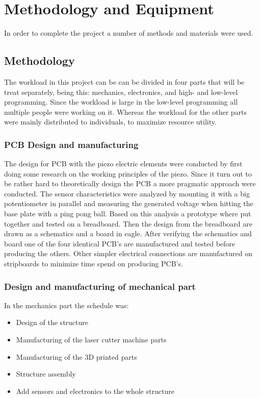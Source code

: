 \chapter{Methodology and Equipment}
\label{chap:methodology}
In order to complete the project a number of methods and materials were used.
\section{Methodology}
\label{sec:methodology}
The workload in this project can be can be divided in four parts that will be treat separately, being this: mechanics, electronics, and high- and low-level programming. Since the workload is large in the low-level programming all multiple people were working on it. Whereas the workload for the other parts were mainly distributed to individuals, to maximize resource utility.   
\subsection{PCB Design and manufacturing}
The design for PCB with the piezo electric elements were conducted by first doing some research on the working principles of the piezo. Since it turn out to be rather hard to theoretically design the PCB  a more pragmatic approach were conducted. 
The sensor characteristics were analyzed by mounting it with a big potentiometer in parallel and measuring the generated voltage when hitting the base plate with a ping pong ball.
Based on this analysis a prototype where put together and tested on a breadboard. 
Then the design from the breadboard are drawn as a schematics and a board in eagle. 
After verifying the schematics and board one of the four identical PCB's are manufactured and tested before producing the others.
Other simpler electrical connections are manufactured on stripboards to minimize time spend on producing PCB's.
\subsection{Design and manufacturing of mechanical part}
In the mechanics part the schedule was:
\begin{itemize}
	\item Design of the structure
	\item Manufacturing of the laser cutter machine parts
	\item Manufacturing of the 3D printed parts
	\item Structure assembly
	\item Add sensors and electronics to the whole structure
\end{itemize}
